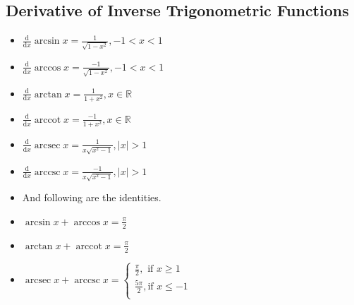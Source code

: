\documentclass[12pt]{article}
\newcommand{\diff}{\mathrm{d}}
\theoremstyle{definition}
\DeclareMathOperator{\arcsec}{arcsec}
\DeclareMathOperator{\arccot}{arccot}
\DeclareMathOperator{\arccsc}{arccsc}
\begin{document}
\subsection{Derivative of Inverse Trigonometric Functions}
\begin{itemize}
\item $\frac{\diff}{\diff x}\arcsin x = \frac{1}{\sqrt{1-x^2}},-1<x<1$
\item $\frac{\diff}{\diff x}\arccos x = \frac{-1}{\sqrt{1-x^2}},-1<x<1$
\item $\frac{\diff}{\diff x}\arctan x = \frac{1}{1+x^2},x\in\mathbb{R}$
\item $\frac{\diff}{\diff x}\arccot x = \frac{-1}{1+x^2},x\in\mathbb{R}$
\item $\frac{\diff}{\diff x}\arcsec x = \frac{1}{x\sqrt{x^2-1}},|x|>1$
\item $\frac{\diff}{\diff x}\arccsc x = \frac{-1}{x\sqrt{x^2-1}},|x|>1$
\item[] And following are the identities.
\item $\arcsin x + \arccos x = \frac{\pi}{2}$
\item $\arctan x + \arccot x = \frac{\pi}{2}$
\item $\arcsec x + \arccsc x =  
										\begin{cases}
											\frac{\pi}{2},\text{  if } x\geq 1\\
											\frac{5\pi}{2},\text{if } x\leq -1\\
											\end{cases}$

\end{itemize}
\end{document}
